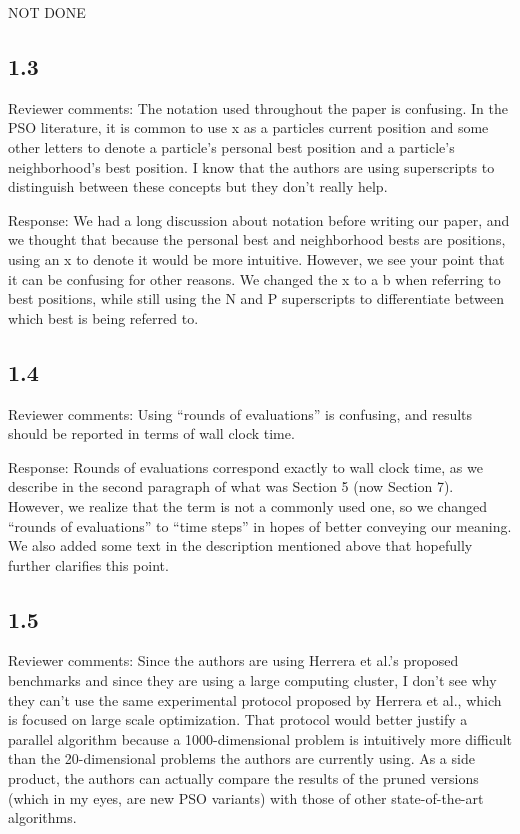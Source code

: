 \documentclass[onecolumn, 12pt]{article}
\begin{document}
NOT DONE

\subsection*{1.3}

Reviewer comments: The notation used throughout the paper is confusing. In the
PSO literature, it is common to use x as a particles current position and some
other letters to denote a particle's personal best position and a particle's
neighborhood's best position. I know that the authors are using superscripts to
distinguish between these concepts but they don't really help.

Response: We had a long discussion about notation before writing our paper, and
we thought that because the personal best and neighborhood bests are positions,
using an x to denote it would be more intuitive.  However, we see your point
that it can be confusing for other reasons.  We changed the x to a b when
referring to best positions, while still using the N and P superscripts to
differentiate between which best is being referred to.

\subsection*{1.4}

Reviewer comments: Using ``rounds of evaluations'' is confusing, and results
should be reported in terms of wall clock time.

Response: Rounds of evaluations correspond exactly to wall clock time, as we
describe in the second paragraph of what was Section 5 (now Section 7).
However, we realize that the term is not a commonly used one, so we changed
``rounds of evaluations'' to ``time steps'' in hopes of better conveying our
meaning.  We also added some text in the description mentioned above that
hopefully further clarifies this point.

\subsection*{1.5}

Reviewer comments: Since the authors are using Herrera et al.'s proposed
benchmarks and since they are using a large computing cluster, I don't see why
they can't use the same experimental protocol proposed by Herrera et al., which
is focused on large scale optimization. That protocol would better justify a
parallel algorithm because a 1000-dimensional problem is intuitively more
difficult than the 20-dimensional problems the authors are currently using. As
a side product, the authors can actually compare the results of the pruned
versions (which in my eyes, are new PSO variants) with those of other
state-of-the-art algorithms.
\end{document}
